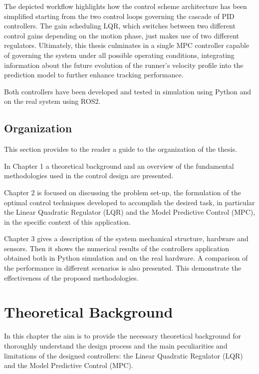 \documentclass[a4paper,12pt,oneside]{book}
\begin{document}
\bigskip
The depicted workflow highlights how the control scheme architecture has been simplified starting from the two control loops governing the cascade of PID controllers. The gain scheduling LQR, which switches between two different control gains depending on the motion phase, just makes use of two different regulators. Ultimately, this thesis culminates in a single MPC controller capable of governing the system under all possible operating conditions, integrating information about the future evolution of the runner's velocity profile into the prediction model to further enhance tracking performance.

\bigskip
Both controllers have been developed and tested in simulation using Python and on the real system using ROS2.

\section*{Organization}
This section provides to the reader a guide to the organization of the thesis. 

In Chapter 1 a theoretical background and an overview of the fundamental methodologies used in the control design are presented. 

Chapter 2 is focused on discussing the problem set-up, the formulation of the optimal control techniques developed to accomplish the desired task, in particular the Linear Quadratic Regulator (LQR) and the Model Predictive Control (MPC), in the specific context of this application.

Chapter 3 gives a description of the system mechanical structure, hardware and sensors. Then it shows the numerical results of the controllers application obtained both in Python simulation and on the real hardware. A comparison of the performance in different scenarios is also presented.
This demonstrate the effectiveness of the proposed methodologies.

\chapter{Theoretical Background}
In this chapter the aim is to provide the necessary theoretical background for thoroughly understand the design process and the main peculiarities and limitations of the designed controllers: the Linear Quadratic Regulator (LQR) and the Model Predictive Control (MPC).
\end{document}
